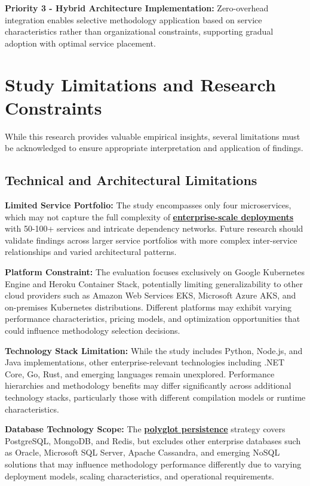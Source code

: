 \textbf{Priority 3 - Hybrid Architecture Implementation:}
Zero-overhead integration enables selective methodology application based on service characteristics rather than organizational constraints, supporting gradual adoption with optimal service placement.

\section{Study Limitations and Research Constraints}
\label{sec:study_limitations}

While this research provides valuable empirical insights, several limitations must be acknowledged to ensure appropriate interpretation and application of findings.

\subsection{Technical and Architectural Limitations}
\label{subsec:technical_limitations}

\textbf{Limited Service Portfolio:} The study encompasses only four microservices, which may not capture the full complexity of \textbf{\hyperref[enterprise_scale_challenges]{enterprise-scale deployments}} with 50-100+ services and intricate dependency networks. Future research should validate findings across larger service portfolios with more complex inter-service relationships and varied architectural patterns.

\textbf{Platform Constraint:} The evaluation focuses exclusively on Google Kubernetes Engine and Heroku Container Stack, potentially limiting generalizability to other cloud providers such as Amazon Web Services EKS, Microsoft Azure AKS, and on-premises Kubernetes distributions. Different platforms may exhibit varying performance characteristics, pricing models, and optimization opportunities that could influence methodology selection decisions.

\textbf{Technology Stack Limitation:} While the study includes Python, Node.js, and Java implementations, other enterprise-relevant technologies including .NET Core, Go, Rust, and emerging languages remain unexplored. Performance hierarchies and methodology benefits may differ significantly across additional technology stacks, particularly those with different compilation models or runtime characteristics.

\textbf{Database Technology Scope:} The \textbf{\hyperref[polyglot2022]{polyglot persistence}} strategy covers PostgreSQL, MongoDB, and Redis, but excludes other enterprise databases such as Oracle, Microsoft SQL Server, Apache Cassandra, and emerging NoSQL solutions that may influence methodology performance differently due to varying deployment models, scaling characteristics, and operational requirements.

